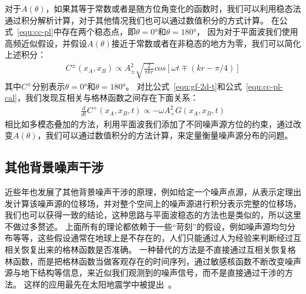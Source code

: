 对于$A(\theta)$，如果其等于常数或者是随方位角变化的函数时，我们可以利用稳态法通过积分解析计算，对于其他情况我们也可以通过数值积分的方式计算。
在公式~\ref{equ:cc-pl}中存在两个稳态点，即$\theta=0°$和$\theta=180°$，
因为对于平面波我们使用高频近似假设，并假设$A(\theta)$接近于常数或者在非稳态的地方为零，我们可以简化上述积分：
\begin{align}
    C^{\pm} (x_A,x_B) \propto A_{\pm}^2 \sqrt{ \frac{2}{\pi kr} }  cos[ \omega t \mp (kr - \pi/4) ]
    \label{equ:cc-pl-cal}
\end{align}
其中$C^{\pm}$分别表示$\theta=0°$和$\theta=180°$。
对比公式~\ref{equ:gf-2d-t}和公式~\ref{equ:cc-pl-cal}，我们发现互相关与格林函数之间存在下面关系：
\begin{align}
    \frac{d}{dt}C^+(x_A,x_B,t) \propto  - \omega A_+^2G(x_A,x_B,t)
    \label{equ:cc-gf}
\end{align}
相比如多模态叠加的方法，利用平面波我们添加了不同噪声源方位的约束，通过改变$A(\theta)$，我们可以通过数值积分的方法计算，来定量衡量噪声源分布的问题。


\subsection{其他背景噪声干涉}
近些年也发展了其他背景噪声干涉的原理，例如给定一个噪声点源，从表示定理出发计算该噪声源的位移场，并对整个空间上的噪声源进行积分表示完整的位移场，
我们也可以获得一致的结论，这种思路与平面波稳态的方法也是类似的，所以这里不做过多赘述。
上面所有的理论都依赖于一些“苛刻”的假设，例如噪声源均匀分布等等，这些假设通常在地球上是不存在的，人们只能通过人为经验来判断经过互相关恢复出来的格林函数是否准确。
一种替代的方法是不直接通过互相关恢复格林函数，而是把格林函数当做客观存在的时间序列，通过敏感核函数不断改变噪声源与地下结构等信息，来近似我们观测到的噪声信号，而不是直接通过干涉的方法。
这样的应用最先在太阳地震学中被提出~\citep{woodard1997implications,gizon2002time}。


